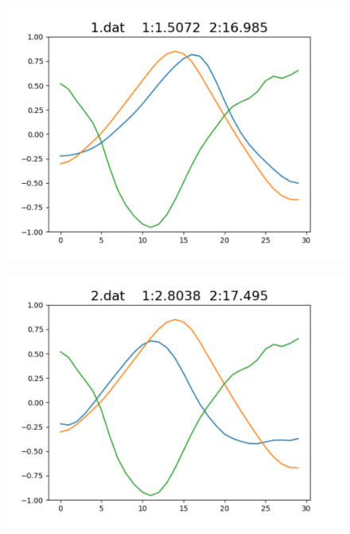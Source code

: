 \begin{figure}[h]
 \begin{minipage}[b]{0.32\linewidth}
  \centering
  \includegraphics[keepaspectratio, scale=0.3]
  {./pic/level1/1_dat.pdf}
  \label{1dat}
 \end{minipage}
 \begin{minipage}[b]{0.32\linewidth}
  \centering
  \includegraphics[keepaspectratio, scale=0.3]
  {./pic/level1/2_dat.pdf}
  \label{2dat}
 \end{minipage}
 \begin{minipage}[b]{0.32\linewidth}
  \centering

\end{minipage}
\end{figure}
